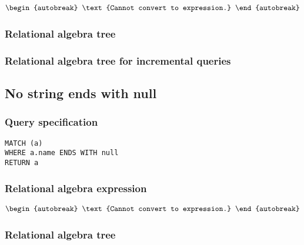 \begin{align*}
\begin{autobreak}
\text{Cannot convert to expression.}
\end{autobreak}
\end{align*}

\subsubsection*{Relational algebra tree}


\subsubsection*{Relational algebra tree for incremental queries}


\subsection{No string ends with null}

\subsubsection*{Query specification}

\begin{lstlisting}
MATCH (a)
WHERE a.name ENDS WITH null
RETURN a
\end{lstlisting}

\subsubsection*{Relational algebra expression}

\begin{align*}
\begin{autobreak}
\text{Cannot convert to expression.}
\end{autobreak}
\end{align*}

\subsubsection*{Relational algebra tree}


